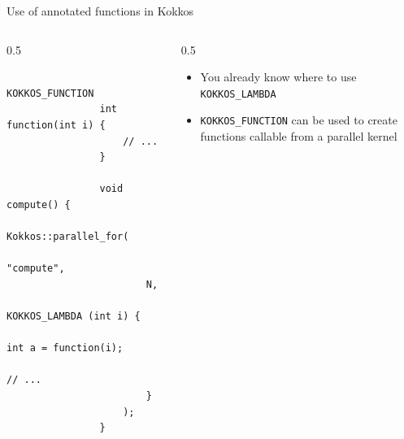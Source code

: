 \documentclass[
    aspectratio=169,
    \createHandout
]{beamer}
\begin{document}
\begin{frame}[fragile]{Use of annotated functions in Kokkos}
    \begin{columns}
        \begin{column}{0.5\linewidth}
            \begin{verbatim}
                KOKKOS_FUNCTION
                int function(int i) {
                    // ...
                }

                void compute() {
                    Kokkos::parallel_for(
                        "compute",
                        N,
                        KOKKOS_LAMBDA (int i) {
                            int a = function(i);
                            // ...
                        }
                    );
                }
            \end{verbatim}
        \end{column}
        \begin{column}{0.5\linewidth}
            \begin{itemize}
                \item You already know where to use \texttt{KOKKOS\_LAMBDA}
                \pause
                \item \texttt{KOKKOS\_FUNCTION} can be used to create functions callable from a parallel kernel
            \end{itemize}
        \end{column}
    \end{columns}
\end{frame}
\end{document}
